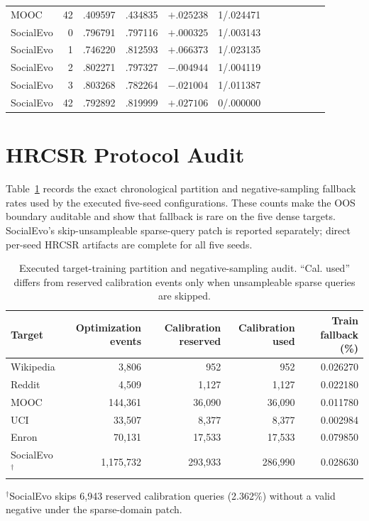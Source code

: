 \documentclass[journal]{IEEEtran}
\begin{document}
\begin{table}[t]
\begin{tabular}{lrrrrr@{\qquad}lrrrrr}
MOOC & 42 & .409597 & .434835 & $+.025238$ & 1/.024471 &  &  &  &  &  &  \\
SocialEvo & 0  & .796791 & .797116 & $+.000325$ & 1/.003143 &  &  &  &  &  &  \\
SocialEvo & 1  & .746220 & .812593 & $+.066373$ & 1/.023135 &  &  &  &  &  &  \\
SocialEvo & 2  & .802271 & .797327 & $-.004944$ & 1/.004119 &  &  &  &  &  &  \\
SocialEvo & 3  & .803268 & .782264 & $-.021004$ & 1/.011387 &  &  &  &  &  &  \\
SocialEvo & 42 & .792892 & .819999 & $+.027106$ & 0/.000000 &  &  &  &  &  &  \\
\bottomrule
\end{tabular}
\end{table}

\section{HRCSR Protocol Audit}
Table~\ref{tab:hrcsr_event_audit} records the exact chronological partition and negative-sampling fallback rates used by the executed five-seed configurations. These counts make the OOS boundary auditable and show that fallback is rare on the five dense targets. SocialEvo's skip-unsampleable sparse-query patch is reported separately; direct per-seed HRCSR artifacts are complete for all five seeds.

\begin{table}[t]
\centering
\caption{Executed target-training partition and negative-sampling audit. ``Cal. used'' differs from reserved calibration events only when unsampleable sparse queries are skipped.}
\label{tab:hrcsr_event_audit}
\small
\begin{tabular}{lrrrr}
\toprule
\textbf{Target} & \textbf{Optimization events} & \textbf{Calibration reserved} & \textbf{Calibration used} & \textbf{Train fallback (\%)} \\
\midrule
Wikipedia & 3,806 & 952 & 952 & 0.026270 \\
Reddit & 4,509 & 1,127 & 1,127 & 0.022180 \\
MOOC & 144,361 & 36,090 & 36,090 & 0.011780 \\
UCI & 33,507 & 8,377 & 8,377 & 0.002984 \\
Enron & 70,131 & 17,533 & 17,533 & 0.079850 \\
SocialEvo$^{\dagger}$ & 1,175,732 & 293,933 & 286,990 & 0.028630 \\
\bottomrule
\end{tabular}
\end{table}
{\footnotesize $^{\dagger}$SocialEvo skips 6,943 reserved calibration queries (2.362\%) without a valid negative under the sparse-domain patch.}
\end{document}
